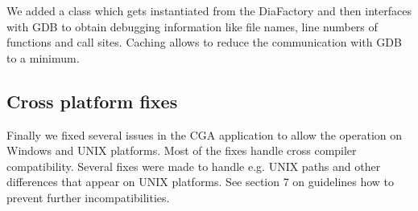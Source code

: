 We added a class which gets instantiated from the DiaFactory and then interfaces with GDB to obtain debugging information like file names, line numbers of functions and call sites. Caching allows to reduce the communication with GDB to a minimum.

\subsection{Cross platform fixes}

Finally we fixed several issues in the CGA application to allow the operation on Windows and UNIX platforms. Most of the fixes handle cross compiler compatibility. Several fixes were made to handle e.g. UNIX paths and other differences that appear on UNIX platforms.  See section 7 on guidelines how to prevent further incompatibilities.
